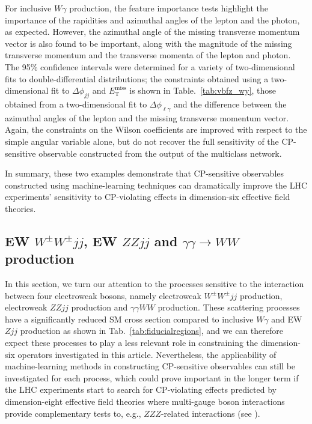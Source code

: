 \documentclass[twocolumn,preprintnumbers,superscriptaddress,nofootinbib,aps,prd,floatfix]{revtex4}
\begin{document}
For inclusive $W\gamma$ production, the feature importance tests highlight the importance of the rapidities and azimuthal angles of the lepton and the photon, as expected. However, the azimuthal angle of the missing transverse momentum vector is also found to be important, along with the magnitude of the missing transverse momentum and the transverse momenta of the lepton and photon. The 95\% confidence intervals were determined for a variety of two-dimensional fits to double-differential distributions; the constraints obtained using a two-dimensional fit to $\Delta\phi_{jj}$ and $E_\textrm{T}^\textrm{miss}$ is shown in Table.~\ref{tab:vbfz_wy}, those obtained from a two-dimensional fit to $\Delta\phi_{\ell\gamma}$ and the difference between the azimuthal angles of the lepton and the missing transverse momentum vector. Again, the constraints on the Wilson coefficients are improved with respect to the simple angular variable alone, but do not recover the full sensitivity of the CP-sensitive observable constructed from the output of the multiclass network.

In summary, these two examples demonstrate that CP-sensitive observables constructed using machine-learning techniques can dramatically improve the LHC experiments' sensitivity to CP-violating effects in dimension-six effective field theories.

\subsection{EW $W^\pm W^\pm jj$, EW $ZZjj$ and $\gamma\gamma\rightarrow WW$ production}
\label{sec:results_quart}
In this section, we turn our attention to the processes sensitive to the interaction between four electroweak bosons, namely electroweak $W^\pm W^\pm jj$ production, electroweak $ZZjj$ production and $\gamma\gamma WW$ production. These scattering processes have a significantly reduced SM cross section compared to inclusive $W\gamma$ and EW $Zjj$ production as shown in Tab.~\ref{tab:fiducialregions}, and we can therefore expect these processes to play a less relevant role in constraining the dimension-six operators investigated in this article. Nevertheless, the applicability of machine-learning methods in constructing CP-sensitive observables can still be investigated for each process, which could prove important in the longer term if the LHC experiments start to search for CP-violating effects predicted by dimension-eight effective field theories where multi-gauge boson interactions provide complementary tests to, e.g., $ZZZ$-related interactions (see \cite{Larios:2000ni,Grzadkowski:2016lpv,Belusca-Maito:2017iob,Corbett:2017ecn,Hernandez-Juarez:2021mhi}).
\end{document}
